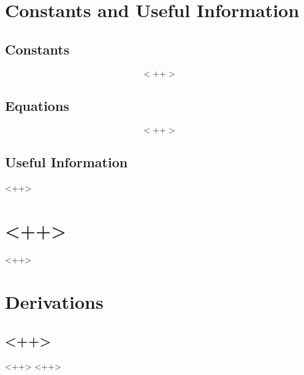 \documentclass[a4paper]{report}
\begin{document}
	
	\chapter{Constants and Useful Information}
		\section{Constants}
			\begin{align}
				<++>
			\end{align}

		\section{Equations}
			\begin{align}
				<++>
			\end{align}
		
		\section{Useful Information}
			<++>
	

	\chapter{<++>}
	\begin{multicols}{2}
		<++>
		
	\end{multicols}

	\chapter{Derivations}
		\section{<++>}
			<++>
		<++>
\end{document}
